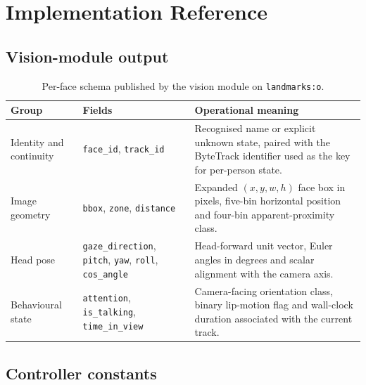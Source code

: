 \chapter{Implementation Reference}
\label{app:implementation}

\section{Vision-module output}
\label{app:vision-schema}

\begin{table}[H]
    \centering
    \footnotesize
    \caption{Per-face schema published by the vision module on \texttt{landmarks:o}.}
    \label{tab:vision-landmarks-schema}
    \begin{tabular}{@{}>{\raggedright\arraybackslash}p{}>{\raggedright\arraybackslash}p{}>{\raggedright\arraybackslash}p{}@{}}
        \toprule
        \textbf{Group} & \textbf{Fields} & \textbf{Operational meaning} \\
        \midrule
        Identity and continuity & \texttt{face\_id}, \texttt{track\_id} & Recognised name or explicit unknown state, paired with the ByteTrack identifier used as the key for per-person state. \\
        Image geometry & \texttt{bbox}, \texttt{zone}, \texttt{distance} & Expanded $(x,y,w,h)$ face box in pixels, five-bin horizontal position and four-bin apparent-proximity class. \\
        Head pose & \texttt{gaze\_direction}, \texttt{pitch}, \texttt{yaw}, \texttt{roll}, \texttt{cos\_angle} & Head-forward unit vector, Euler angles in degrees and scalar alignment with the camera axis. \\
        Behavioural state & \texttt{attention}, \texttt{is\_talking}, \texttt{time\_in\_view} & Camera-facing orientation class, binary lip-motion flag and wall-clock duration associated with the current track. \\
        \bottomrule
    \end{tabular}
\end{table}

\section{Controller constants}
\label{app:constants}

